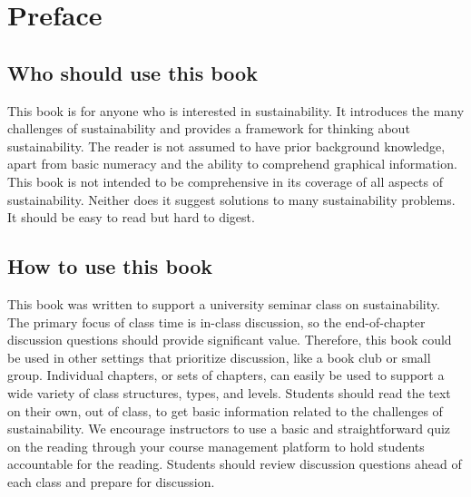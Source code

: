 
\setcounter{page}{21}

{
  \chapter*{Preface}
  \thispagestyle{plain}
  
  \noindent
  
  
    \section*{Who should use this book} 
    
    This book is for anyone who is interested in sustainability.
  It introduces the many challenges of sustainability
  and provides a framework for thinking about sustainability.
  The reader is not assumed to have prior background knowledge,
  apart from basic numeracy and the ability to comprehend graphical information.
  This book is not intended to be comprehensive in its coverage of all aspects of 
  sustainability.
  Neither does it suggest solutions to many sustainability problems. 
  It should be easy to read but hard to digest.
  
  
    \section*{How to use this book} 
    
    This book was written to support a university seminar class %
  on sustainability. 
  The primary focus of class time is in-class discussion, so 
  the end-of-chapter discussion questions should provide significant value. 
  Therefore, this book could be used in other settings that prioritize discussion,
  like a book club or small group.
  Individual chapters, or sets of chapters, can easily be
  used to support a wide variety of class structures, types, and levels.
  Students should read the text on their own, out of class, to get 
  basic information related to  the challenges of sustainability. 
  We encourage instructors to use a basic and straightforward quiz on the reading 
  through your course management platform to hold students accountable for the 
  reading. 
  Students should review discussion questions ahead of each class and 
  prepare for discussion.
  
}
